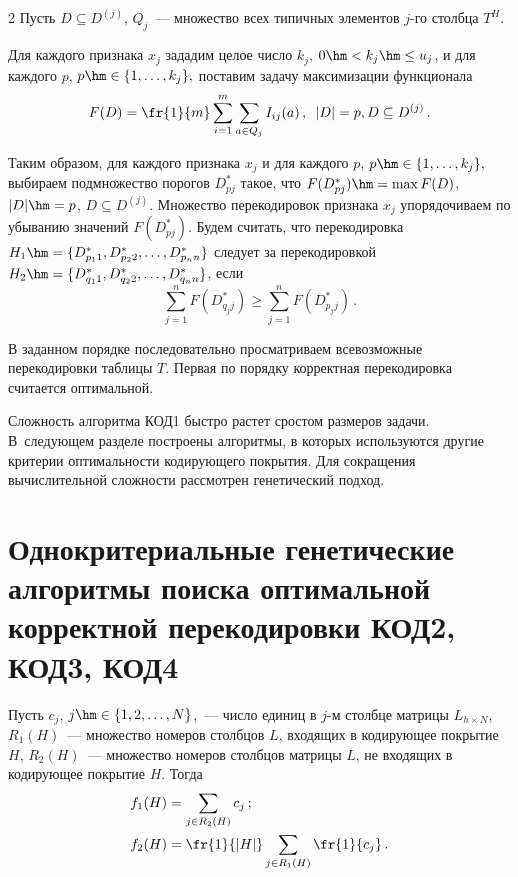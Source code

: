 \begin{multicols}{2}
Пусть $D \subseteq D^{(j)}$, $Q_j$~--- множество всех типичных элементов $j$-го столбца $T^H$.

Для каждого признака $x_j$ зададим целое число $k_j$, $0\hm<k_j\hm\leq u_j$,
и для каждого $p$, $p\hm\in \{1,\ldots ,k_j\},$ поставим задачу максимизации
функционала
$$
    F(D)=\fr{1}{m} \sum\limits^m_{i=1} \sum\limits_{a\in Q_j} I_{ij}(a)\,, 
    \enskip |D|=p, D \subseteq D^{(j)}\,.
$$

Таким образом, для каждого признака $x_j$ и для каждого $p$, $p\hm\in
\{1,\ldots ,k_j\},$ выбираем подмножество порогов $D^*_{pj}$ такое, что
$F(D^*_{pj})\hm=\max F(D)$, $|D|\hm=p$, $D \subseteq D^{(j)}$. Множество
перекодировок признака $x_j$ упорядочиваем по убыванию значений
$F(D^*_{pj})$. Будем считать, что перекодировка
$H_1\hm=\{D^*_{p_11},D^*_{p_22},\ldots ,D^*_{p_nn}\}$ следует за
перекодировкой $H_2\hm=\{D^*_{q_11},D^*_{q_22},\ldots ,D^*_{q_nn}\}$, если
$$
    \sum\limits^n_{j=1}F(D^*_{q_jj})\geq \sum\limits^n_{j=1}F(D^*_{p_jj})\,.
$$

В заданном порядке последовательно просматриваем всевозможные
перекодировки таблицы $T$. Первая по порядку корректная
перекодировка считается оптимальной.

Сложность алгоритма КОД1 быстро растет с\linebreak рос\-том размеров задачи. 
В~следующем разделе построены алгоритмы, в которых используются другие
критерии оптимальности кодирующего покрытия. Для сокращения
вычислительной сложности рассмотрен генетический подход.

\vspace*{-9pt}

\section{Однокритериальные генетические алгоритмы поиска оптимальной корректной 
перекодировки КОД2, КОД3, КОД4}

\vspace*{-2pt}

Пусть $c_j$, $j \hm\in \{1,2,\ldots ,N\}$,~--- число единиц в $j$-м столбце
матрицы $L_{h \times N}$, $R_1(H)$~--- множество номеров столбцов
$L$, входящих в кодирующее покрытие $H$, $R_2(H)$~--- множество
номеров столбцов матрицы $L$, не входящих в кодирующее покрытие $H$.
Тогда
\begin{align*}
    f_1(H) &= \sum\limits_{j \in R_2(H)} c_j\,;
\\
    f_2(H) &= \fr{1}{|H|}\sum\limits_{j \in R_1(H)}\fr{1}{c_j}\,.
\end{align*}


\end{multicols}
